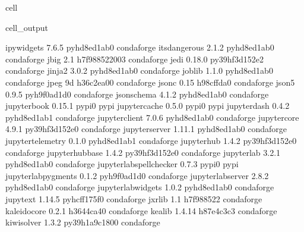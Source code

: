 \documentclass[letterpaper,table,10pt,english]{jupyterBook}
\begin{document}
\begin{sphinxuseclass}{cell}
\begin{sphinxVerbatimOutput}
\begin{sphinxuseclass}{cell_output}
\begin{sphinxVerbatim}[commandchars=\\\{\}]
ipywidgets                7.6.5              pyhd8ed1ab\PYGZus{}0    conda\PYGZhy{}forge
itsdangerous              2.1.2              pyhd8ed1ab\PYGZus{}0    conda\PYGZhy{}forge
jbig                      2.1               h7f98852\PYGZus{}2003    conda\PYGZhy{}forge
jedi                      0.18.0           py39hf3d152e\PYGZus{}2    conda\PYGZhy{}forge
jinja2                    3.0.2              pyhd8ed1ab\PYGZus{}0    conda\PYGZhy{}forge
joblib                    1.1.0              pyhd8ed1ab\PYGZus{}0    conda\PYGZhy{}forge
jpeg                      9d                   h36c2ea0\PYGZus{}0    conda\PYGZhy{}forge
json\PYGZhy{}c                    0.15                 h98cffda\PYGZus{}0    conda\PYGZhy{}forge
json5                     0.9.5              pyh9f0ad1d\PYGZus{}0    conda\PYGZhy{}forge
jsonschema                4.1.2              pyhd8ed1ab\PYGZus{}0    conda\PYGZhy{}forge
jupyter\PYGZhy{}book              0.15.1                   pypi\PYGZus{}0    pypi
jupyter\PYGZhy{}cache             0.5.0                    pypi\PYGZus{}0    pypi
jupyter\PYGZhy{}dash              0.4.2              pyhd8ed1ab\PYGZus{}1    conda\PYGZhy{}forge
jupyter\PYGZus{}client            7.0.6              pyhd8ed1ab\PYGZus{}0    conda\PYGZhy{}forge
jupyter\PYGZus{}core              4.9.1            py39hf3d152e\PYGZus{}0    conda\PYGZhy{}forge
jupyter\PYGZus{}server            1.11.1             pyhd8ed1ab\PYGZus{}0    conda\PYGZhy{}forge
jupyter\PYGZus{}telemetry         0.1.0              pyhd8ed1ab\PYGZus{}1    conda\PYGZhy{}forge
jupyterhub                1.4.2            py39hf3d152e\PYGZus{}0    conda\PYGZhy{}forge
jupyterhub\PYGZhy{}base           1.4.2            py39hf3d152e\PYGZus{}0    conda\PYGZhy{}forge
jupyterlab                3.2.1              pyhd8ed1ab\PYGZus{}0    conda\PYGZhy{}forge
jupyterlab\PYGZhy{}spellchecker   0.7.3                    pypi\PYGZus{}0    pypi
jupyterlab\PYGZus{}pygments       0.1.2              pyh9f0ad1d\PYGZus{}0    conda\PYGZhy{}forge
jupyterlab\PYGZus{}server         2.8.2              pyhd8ed1ab\PYGZus{}0    conda\PYGZhy{}forge
jupyterlab\PYGZus{}widgets        1.0.2              pyhd8ed1ab\PYGZus{}0    conda\PYGZhy{}forge
jupytext                  1.14.5             pyhcff175f\PYGZus{}0    conda\PYGZhy{}forge
jxrlib                    1.1                  h7f98852\PYGZus{}2    conda\PYGZhy{}forge
kaleido\PYGZhy{}core              0.2.1                h3644ca4\PYGZus{}0    conda\PYGZhy{}forge
kealib                    1.4.14               h87e4c3c\PYGZus{}3    conda\PYGZhy{}forge
kiwisolver                1.3.2            py39h1a9c180\PYGZus{}0    conda\PYGZhy{}forge

\end{sphinxVerbatim}
\end{sphinxuseclass}
\end{sphinxVerbatimOutput}
\end{sphinxuseclass}
\end{document}
